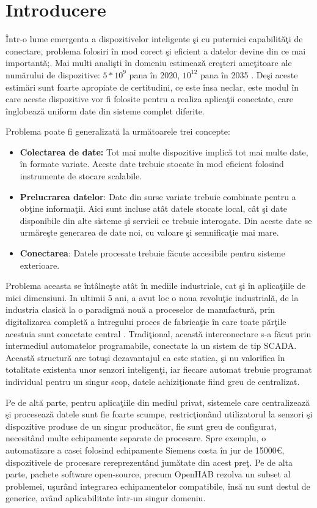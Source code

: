 \chapter{Introducere}

Într-o lume emergenta a dispozitivelor inteligente şi cu puternici capabilităţi de conectare, problema folosiri în mod corect şi eficient a datelor devine din ce mai importantă;. Mai multi analişti în domeniu estimează creşteri ameţitoare ale numărului de dispozitive: $5*10^9$ pana în 2020, $10^{12}$ pana în 2035 \autocite{iotGrowth} . Deşi aceste estimări sunt foarte apropiate de certitudini, ce este însa neclar, este modul în care aceste dispozitive vor fi folosite pentru a realiza aplicaţii conectate, care înglobează uniform date din sisteme complet diferite.

Problema poate fi generalizată la următoarele trei concepte:
\begin{itemize}
	\item  \textbf{Colectarea de date:} Tot mai multe dispozitive implică tot mai multe date, în formate variate. Aceste date trebuie stocate în mod eficient folosind instrumente de stocare scalabile. 
	\item \textbf{Prelucrarea datelor}: Date din surse variate trebuie combinate pentru a obţine informaţii. Aici sunt incluse atât datele stocate local, cât şi date disponibile din alte sisteme şi servicii ce trebuie interogate. Din aceste date se urmăreşte generarea de date noi, cu valoare şi semnificaţie mai mare.
	\item \textbf{Conectarea}: Datele procesate trebuie făcute accesibile pentru sisteme exterioare.
\end{itemize}

Problema aceasta se întâlneşte atât în mediile industriale, cat şi în aplicaţiile de mici dimensiuni. 
In ultimii 5 ani, a avut loc o noua revoluţie industrială, de la industria clasică la o paradigmă nouă a proceselor de manufactură, prin digitalizarea completă a întregului proces de fabricaţie în care toate părţile acestuia sunt conectate central \autocite{deloitteReport}. 
Tradiţional, această interconectare s-a făcut prin intermediul automatelor programabile, conectate la un sistem de tip SCADA. Această structură are totuşi dezavantajul ca este statica, şi nu valorifica în totalitate existenta unor senzori inteligenţi, iar fiecare automat trebuie programat individual pentru un singur scop, datele achiziţionate fiind greu de centralizat.

Pe de altă parte, pentru aplicaţiile din mediul privat, sistemele care centralizează şi procesează datele sunt fie foarte scumpe, restricţionând utilizatorul la senzori şi dispozitive produse de un singur producător, fie sunt greu de configurat, necesitând multe echipamente separate de procesare. Spre exemplu, o automatizare a casei folosind echipamente Siemens costa în jur de 15000\euro, dispozitivele de procesare rereprezentând jumătate din acest preţ. Pe de alta parte, pachete software open-source, precum OpenHAB \autocite{openHab} rezolva un subset al problemei, uşurând integrarea echipamentelor compatibile, însă nu sunt destul de generice, având aplicabilitate într-un singur domeniu.

